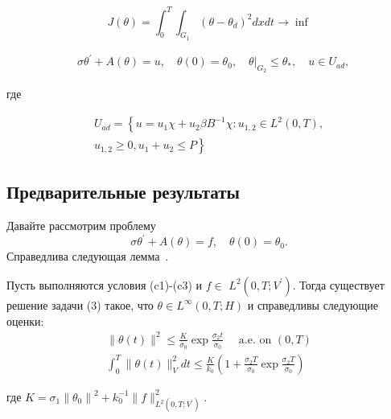 \begin{definition}
    [Problem (P)]
    \label{subsec:ch3:sec2:subsec3}
    \[
        J(\theta)=\int_{0}^{T}
        \int_{G_{1}}\left(\theta-\theta_{d}\right)^{2} d x d t \rightarrow \inf
    \]

    \[
        \begin{aligned}
            & \sigma \theta^{\prime}+A(\theta)=u,
            \quad \theta(0)=\theta_{0},\left.\quad
            \theta\right|_{G_{2}} \leq \theta_{*},
            \quad u \in U_{a d},
        \end{aligned}
    \]

    где

    \[
        \begin{array}{r}
            U_{a d}=\left\{u=u_{1} \chi+u_{2} \beta B^{-1}
            \chi: u_{1,2} \in L^{2}(0, T),\right. \\
            \left.u_{1,2} \geq 0, u_{1}+u_{2} \leq P\right\}
        \end{array}
    \]
\end{definition}

\subsection{Предварительные результаты}
\label{subsec:ch3:sec2:subsec4}
Давайте рассмотрим проблему
\begin{equation}
    \label{eq:3_2:3}
    \sigma \theta^{\prime}+A(\theta)=f, \quad \theta(0)=\theta_{0}.
\end{equation}
Справедлива следующая лемма~\cite{Inverse_Kovtanyuk2021}.

\begin{lemma}
    \label{lm:3_2:1}
    Пусть выполняются условия (c1)-(c3) и
    $f \in$ $L^{2}\left(0, T ; V^{\prime}\right)$.
    Тогда существует решение задачи (3) такое, что
    $\theta \in L^{\infty}(0, T ; H)$ и справедливы следующие оценки:
    \[
        \begin{gathered}
            \|\theta(t)\|^{2} \leq \frac{K}{\sigma_{0}} \exp \frac{\sigma_{2} t}{\sigma_{0}}
            \quad \text { a.e. on }(0, T) \\
            \int_{0}^{T}\|\theta(t)\|_{V}^{2} d t \leq
            \frac{K}{k_{0}}\left(1+\frac{\sigma_{2} T}{\sigma_{0}} \exp
            \frac{\sigma_{2} T}{\sigma_{0}}\right)
        \end{gathered}
    \]

    где $K=\sigma_{1}\left\|\theta_{0}\right\|^{2}
    + k_{0}^{-1}\|f\|_{L^{2}\left(0, T; V^{\prime}\right)}^{2}$.
\end{lemma}



